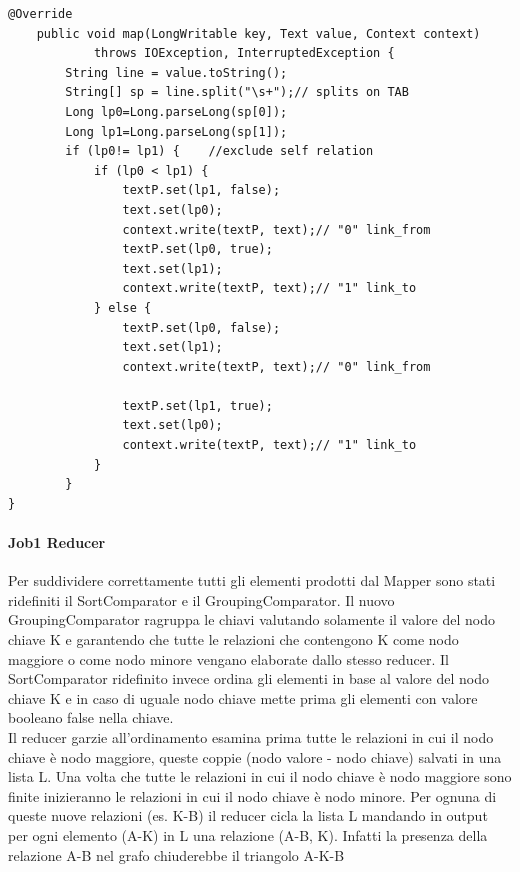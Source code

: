 \documentclass[paper=a4, fontsize=11pt]{scrartcl}	%
\numberwithin{equation}{section}															%
\numberwithin{figure}{section}																%
\numberwithin{table}{section}																%
\begin{document}
\begin{lstlisting}[label=Mapper1,caption=Implementazione del Mapper1]
@Override
	public void map(LongWritable key, Text value, Context context)
			throws IOException, InterruptedException {
		String line = value.toString();
		String[] sp = line.split("\s+");// splits on TAB
		Long lp0=Long.parseLong(sp[0]);
		Long lp1=Long.parseLong(sp[1]);
		if (lp0!= lp1) { 	//exclude self relation
			if (lp0 < lp1) {
				textP.set(lp1, false);
				text.set(lp0);
				context.write(textP, text);// "0" link_from
				textP.set(lp0, true);
				text.set(lp1);
				context.write(textP, text);// "1" link_to
			} else {
				textP.set(lp0, false);
				text.set(lp1);
				context.write(textP, text);// "0" link_from

				textP.set(lp1, true);
				text.set(lp0);
				context.write(textP, text);// "1" link_to
			}
		}
}\end{lstlisting}
\paragraph{Job1 Reducer}

Per suddividere correttamente tutti gli elementi prodotti dal Mapper sono stati ridefiniti il SortComparator e il GroupingComparator.
Il nuovo GroupingComparator ragruppa le chiavi valutando solamente il valore del nodo chiave K e garantendo che tutte le relazioni che contengono K come nodo maggiore o come nodo minore vengano elaborate dallo stesso reducer. Il SortComparator ridefinito invece ordina gli elementi in base al valore del nodo chiave K e in caso di uguale nodo chiave mette prima gli elementi con valore booleano false nella chiave.\\ Il reducer  garzie all'ordinamento esamina prima tutte le relazioni in cui il nodo chiave è nodo maggiore, queste coppie (nodo valore - nodo chiave) salvati in una lista L. Una volta che tutte le relazioni in cui il nodo chiave è nodo maggiore sono finite inizieranno le relazioni in cui il nodo chiave è nodo minore. Per ognuna di queste nuove relazioni (es. K-B) il reducer cicla la lista L mandando in output per ogni elemento (A-K) in L una relazione (A-B, K). Infatti la presenza della relazione A-B nel grafo chiuderebbe il triangolo A-K-B 
\end{document}
